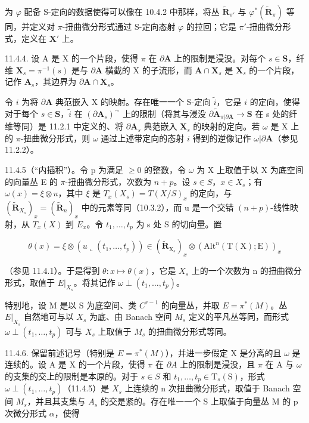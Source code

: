 为 \(\varphi\) 配备 S-定向的数据使得可以像在 10.4.2 中那样，将丛 \(\tilde{\mathbf{R}}_{\pi'}\) 与 \(\varphi^{*}(\tilde{\mathbf{R}}_{\pi})\) 等同，并定义对 \(\pi\)-扭曲微分形式通过 S-定向态射 \(\varphi\) 的拉回；它是 \(\pi'\)-扭曲微分形式，定义在 \(\mathbf{X}'\) 上。

11.4.4. 设 A 是 X 的一个片段，使得 \(\pi\) 在 \(\partial\mathbf{A}\) 上的限制是浸没。对每个 \(s\in\mathbf{S}\)，纤维 \(\mathbf{X}_{s}=\pi^{-1}(s)\) 是与 \(\partial\mathbf{A}\) 横截的 X 的子流形，而 \(\mathbf{A}\cap\mathbf{X}_{s}\) 是 \(\mathbf{X}_{s}\) 的一个片段，记作 \(\mathbf{A}_{s}\)，其边界为 \(\partial\mathbf{A}\cap\mathbf{X}_{s}\)。

令 \(i\) 为将 \(\partial\mathbf{A}\) 典范嵌入 X 的映射。存在唯一一个 S-定向 \(\tilde{i}\)，它是 \(i\) 的定向，使得对于每个 \(s\in\mathbf{S}\)，\(\tilde{i}\) 在 \((\partial\mathbf{A}_{s})^{\sim}\) 上的限制（将其与浸没 \(\partial\widetilde{\mathbf{A}}_{\pi|\partial\mathbf{A}}\to\mathbf{S}\) 在 s 处的纤维等同）是 11.2.1 中定义的、将 \(\partial\mathbf{A}_{s}\) 典范嵌入 \(\mathbf{X}_{s}\) 的映射的定向。若 \(\omega\) 是 X 上的 \(\pi\)-扭曲微分形式，则 \(\omega\) 通过上述带定向的态射 \(i\) 得到的逆像记作 \(\omega|\partial\mathbf{A}\)（参见 11.2.2）。

11.4.5（“内插积”）。令 p 为满足 \(\geqslant 0\) 的整数，令 \(\omega\) 为 X 上取值于以 X 为底空间的向量丛 E 的 \(\pi\)-扭曲微分形式，次数为 \(n + p\)。设 \(s \in S\)，\(x \in X_s\)；有 \(\omega(x) = \xi \otimes u\)，其中 \(\xi\) 是 \(T_x(X_s) = T(X/S)_x\) 的定向，与 \((\tilde{\mathbf{R}}_{X_s})_x = (\tilde{\mathbf{R}}_n)_x\) 中的元素等同（10.3.2），而 u 是一个交错 \((n + p)\)-线性映射，从 \(T_x(X)\) 到 \(E_x\)。令 \(t_1, \ldots, t_p\) 为 s 处 S 的切向量。置

\[
\theta (x) = \xi \otimes (u \llcorner (t _ {1}, \dots , t _ {p})) \in (\tilde {\mathbf {R}} _ {\mathrm{X} _ {s}}) _ {x} \otimes (\mathrm{Alt} ^ {n} (\mathrm{T} (\mathrm{X}); \mathrm{E})) _ {x}
\]

（参见 11.4.1）。于是得到 \(\theta: x \mapsto \theta(x)\)，它是 \(X_s\) 上的一个次数为 n 的扭曲微分形式，取值于 \(E|_{X_{s}}\)。将其记作 \(\omega \perp (t_1, \ldots, t_p)\)。

特别地，设 M 是以 S 为底空间、类 \(C^{r-1}\) 的向量丛，并取 \(E = \pi^{*}(M)\)。丛 \(E|_{X_{s}}\) 自然地可与以 \(X_{s}\) 为底、由 Banach 空间 \(M_{s}\) 定义的平凡丛等同，而形式 \(\omega\perp(t_{1},\ldots,t_{p})\) 可与 \(X_{s}\) 上取值于 \(M_{s}\) 的扭曲微分形式等同。

11.4.6. 保留前述记号（特别是 \(E=\pi^{*}(M)\)），并进一步假定 X 是分离的且 \(\omega\) 是连续的。设 A 是 X 的一个片段，使得 \(\pi\) 在 \(\partial A\) 上的限制是浸没，且 \(\pi\) 在 A 与 \(\omega\) 的支集的交上的限制是本原的。对于 \(s \in S\) 和 \(t_{1},\ldots,t_{p}\in\mathrm{T}_{s}(\mathrm{S})\)，形式 \(\omega \perp (t_{1}, \ldots, t_{p})\)（11.4.5）是 \(X_{s}\) 上连续的 n 次扭曲微分形式，取值于 Banach 空间 \(M_{s}\)，并且其支集与 \(A_{s}\) 的交是紧的。存在唯一一个 S 上取值于向量丛 M 的 p 次微分形式 \(\alpha\)，使得

